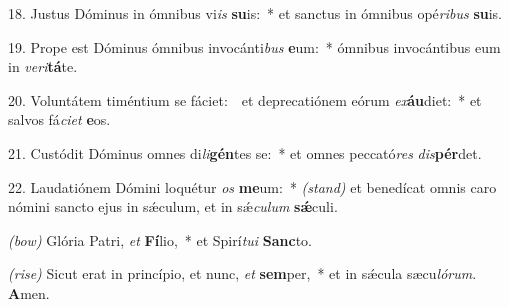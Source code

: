 18. Justus Dóminus in ómnibus vi\textit{is} \textbf{su}is:~* et sanctus in ómnibus opé\textit{ri}\textit{bus} \textbf{su}is.

19. Prope est Dóminus ómnibus invocánti\textit{bus} \textbf{e}um:~* ómnibus invocántibus eum in \textit{ve}\textit{ri}\textbf{tá}te.

20. Voluntátem timéntium se fáciet:~\GreDagger\ et deprecatiónem eórum \textit{ex}\textbf{áu}diet:~* et salvos fá\textit{ci}\textit{et} \textbf{e}os.

21. Custódit Dóminus omnes di\textit{li}\textbf{gén}tes se:~* et omnes peccató\textit{res} \textit{dis}\textbf{pér}det.

22. Laudatiónem Dómini loquétur \textit{os} \textbf{me}um:~* {\color{red}\textit{(stand)}} et benedícat omnis caro nómini sancto ejus in s\'{\ae}culum, et in s\'{\ae}\textit{cu}\textit{lum} \textbf{s\'{\ae}}culi.

{\color{red}\textit{(bow)}} Glória Patri, \textit{et} \textbf{Fí}lio,~* et Spirí\textit{tu}\textit{i} \textbf{Sanc}to.

{\color{red}\textit{(rise)}} Sicut erat in princípio, et nunc, \textit{et} \textbf{sem}per,~* et in s\'{\ae}cula sæcu\textit{ló}\textit{rum}. \textbf{A}men.